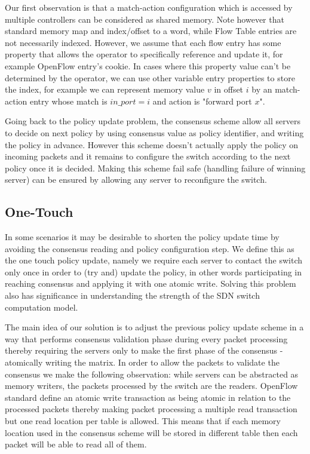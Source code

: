 \documentclass[conference]{sigcomm-alternate}
\begin{document}
Our first observation is that a match-action configuration which is accessed by multiple controllers can be considered as shared memory. Note however that standard memory map and index/offset to a word, while Flow Table entries are not necessarily indexed. However, we assume that each flow entry has some property that allows the operator to specifically reference and update it, for example OpenFlow entry's cookie. In cases where this property value can't be determined by the operator, we can use other variable entry properties to store the index, for example we can represent memory value $v$ in offset $i$ by an match-action entry whose match is $in\_port = i$ and action is "forward port $x$".


Going back to the policy update problem, the consensus scheme allow all servers to decide on next policy by using consensus value as policy identifier, and writing the policy in advance. However this scheme doesn't actually apply the policy on incoming packets and it remains to configure the switch according to the next policy once it is decided. Making this scheme fail safe (handling failure of winning server) can be ensured by allowing any server to reconfigure the switch.

\subsection{ One-Touch}

In some scenarios it may be desirable to shorten the policy update time by avoiding the consensus reading and policy configuration step. We define this as the one touch policy update, namely we require each server to contact the switch only once in order to (try and) update the policy, in other words participating in reaching consensus and applying it with one atomic write. Solving this problem also has significance in understanding the strength of the SDN switch computation model.

The main idea of our solution is to adjust the previous policy update scheme in a way that performs consensus validation phase during every packet processing thereby requiring the servers only to make the first phase of the consensus - atomically writing the matrix.
In order to allow the packets to validate the consensus we make the following observation: while servers can be abstracted as memory writers, the packets processed by the switch are the readers. OpenFlow standard define an atomic write transaction as being atomic in relation to the processed packets thereby making packet processing a multiple read transaction but one read location per table is allowed. This means that if each memory location used in the consensus scheme will be stored in different table then each packet will be able to read all of them.
\end{document}
